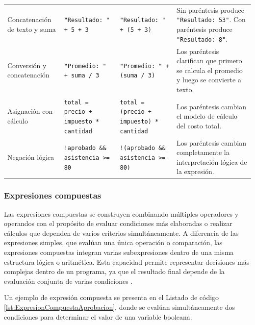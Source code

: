 \documentclass[12pt,twoside]{book}
\begin{document}
\begin{table}[H]
\begin{tabularx}{\textwidth}{
									>{\raggedright\arraybackslash}X
									>{\raggedright\arraybackslash}X
									>{\raggedright\arraybackslash}X
									>{\raggedright\arraybackslash}X}
								Concatenación de texto y suma &
								\texttt{"Resultado: " + 5 + 3} &
								\texttt{"Resultado: " + (5 + 3)} &
								Sin paréntesis produce \texttt{"Resultado: 53"}. Con paréntesis produce \texttt{"Resultado: 8"}. \\
								
								Conversión y concatenación &
								\texttt{"Promedio: " + suma / 3} &
								\texttt{"Promedio: " + (suma / 3)} &
								Los paréntesis clarifican que primero se calcula el promedio y luego se convierte a texto. \\
								
								Asignación con cálculo &
								\texttt{total = precio + impuesto * cantidad} &
								\texttt{total = (precio + impuesto) * cantidad} &
								Los paréntesis cambian el modelo de cálculo del costo total. \\
								
								Negación lógica &
								\texttt{!aprobado \&\& asistencia >= 80} &
								\texttt{!(aprobado \&\& asistencia >= 80)} &
								Los paréntesis cambian completamente la interpretación lógica de la expresión. \\
								
								\bottomrule
							\end{tabularx}
							
						\end{table}
					\subsubsection{Expresiones compuestas}
						\noindent
						Las expresiones compuestas se construyen combinando múltiples operadores y operandos con el propósito de evaluar condiciones más elaboradas o realizar cálculos que dependen de varios criterios simultáneamente. A diferencia de las expresiones simples, que evalúan una única operación o comparación, las expresiones compuestas integran varias subexpresiones dentro de una misma estructura lógica o aritmética. Esta capacidad permite representar decisiones más complejas dentro de un programa, ya que el resultado final depende de la evaluación conjunta de varias condiciones \cite{Sebesta2018Concepts,Pierce2002Types}.
						
						Un ejemplo de expresión compuesta se presenta en el Listado de código \ref{lst:ExpresionCompuestaAprobacion}, donde se evalúan simultáneamente dos condiciones para determinar el valor de una variable booleana.
						
\end{document}
